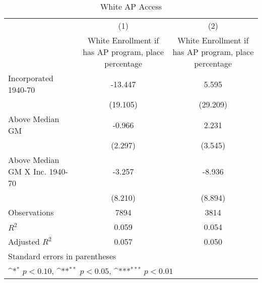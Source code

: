 \begin{table}[htbp]\centering
\def\sym#1{\ifmmode^{#1}\else\(^{#1}\)\fi}
\caption{White AP Access}
\begin{tabular}{l*{2}{c}}
\hline\hline
                    &\multicolumn{1}{c}{(1)}&\multicolumn{1}{c}{(2)}\\
                    &\multicolumn{1}{c}{White Enrollment if has AP program, place percentage}&\multicolumn{1}{c}{White Enrollment if has AP program, place percentage}\\
\hline
Incorporated 1940-70&     -13.447         &       5.595         \\
                    &    (19.105)         &    (29.209)         \\
[1em]
Above Median GM     &      -0.966         &       2.231         \\
                    &     (2.297)         &     (3.545)         \\
[1em]
Above Median GM X Inc. 1940-70&      -3.257         &      -8.936         \\
                    &     (8.210)         &     (8.894)         \\
\hline
Observations        &        7894         &        3814         \\
\(R^{2}\)           &       0.059         &       0.054         \\
Adjusted \(R^{2}\)  &       0.057         &       0.050         \\
\hline\hline
\multicolumn{3}{l}{\footnotesize Standard errors in parentheses}\\
\multicolumn{3}{l}{\footnotesize \sym{*} \(p<0.10\), \sym{**} \(p<0.05\), \sym{***} \(p<0.01\)}\\
\end{tabular}
\end{table}
